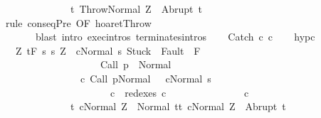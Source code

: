 \begin{isabellebody}
\ \ \ \ \ \ \ \ \ \ \ \ \ \ {\isacharbraceleft}t{\isachardot}\ {\isasymGamma}{\isasymturnstile}{\isasymlangle}Throw{\isacharcomma}Normal\ Z{\isasymrangle}\ {\isasymRightarrow}\ Abrupt\ t{\isacharbraceright}{\isachardoublequoteclose}\isanewline
\ \ \ \ \isamarkupfalse%
\ {\isacharparenleft}rule\ conseqPre\ {\isacharbrackleft}OF\ hoaret{\isachardot}Throw{\isacharbrackright}{\isacharparenright}\ \isanewline
\ \ \ \ \ \ \ {\isacharparenleft}blast\ intro{\isacharcolon}\ exec{\isachardot}intros\ terminates{\isachardot}intros{\isacharparenright}\isanewline
{}\isamarkupfalse%
\isanewline
\ \ \isamarkupfalse%
\ {\isacharparenleft}Catch\ c\ c\isanewline
\ \ \isamarkupfalse%
\ hyp{\isacharunderscore}c{}{\isacharcolon}\isanewline
\ \ \ {\isachardoublequoteopen}{\isasymforall}Z{\isachardot}\ {\isasymGamma}{\isacharcomma}{\isasymTheta}{\isasymturnstile}\isactrlsub t\isactrlbsub {\isacharslash}F\isactrlesub \ {\isacharbraceleft}s{\isachardot}\ s{\isacharequal}\ Z\ {\isasymand}\ {\isasymGamma}{\isasymturnstile}{\isasymlangle}cNormal\ s{\isasymrangle}\ {\isasymRightarrow}{\isasymnotin}{\isacharparenleft}{\isacharbraceleft}Stuck{\isacharbraceright}\ {\isasymunion}\ Fault\ {\isacharbackquote}\ {\isacharparenleft}{\isacharminus}F{\isacharparenright}{\isacharparenright}\ {\isasymand}\ \isanewline
\ \ \ \ \ \ \ \ \ \ \ \ \ \ \ \ \ \ \ \ {\isasymGamma}{\isasymturnstile}Call\ p\ {\isasymdown}\ Normal\ {\isasymsigma}\ {\isasymand}\isanewline
\ \ \ \ \ \ \ \ \ \ \ \ \ \ \ \ {\isacharparenleft}{\isasymexists}c{\isacharprime}{\isachardot}\ {\isasymGamma}{\isasymturnstile}{\isacharparenleft}Call\ p{\isacharcomma}Normal\ {\isasymsigma}{\isacharparenright}\ {\isasymrightarrow}\isactrlsup {\isacharplus}\ {\isacharparenleft}c{\isacharprime}{\isacharcomma}Normal\ s{\isacharparenright}\ {\isasymand}\ \isanewline
\ \ \ \ \ \ \ \ \ \ \ \ \ \ \ \ \ \ \ \ \ \ c\ {\isasymin}\ redexes\ c{\isacharprime}{\isacharparenright}{\isacharbraceright}\isanewline
\ \ \ \ \ \ \ \ \ \ \ \ \ \ \ c\ \isanewline
\ \ \ \ \ \ \ \ \ \ \ \ \ \ {\isacharbraceleft}t{\isachardot}\ {\isasymGamma}{\isasymturnstile}{\isasymlangle}cNormal\ Z{\isasymrangle}\ {\isasymRightarrow}\ Normal\ t{\isacharbraceright}{\isacharcomma}{\isacharbraceleft}t{\isachardot}\ {\isasymGamma}{\isasymturnstile}{\isasymlangle}cNormal\ Z{\isasymrangle}\ {\isasymRightarrow}\ Abrupt\ t{\isacharbraceright}{\isachardoublequoteclose}\isanewline

\end{isabellebody}
